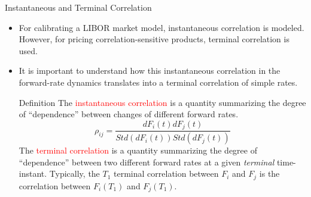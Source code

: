 \documentclass{beamer}
\begin{document}
\begin{frame}{Instantaneous and Terminal Correlation}
\begin{itemize}
\item For calibrating a LIBOR market model, instantaneous
correlation is modeled. However, for pricing correlation-sensitive products, terminal correlation is used.
\item It is important to understand how this instantaneous correlation in the forward-rate dynamics translates into a terminal correlation of simple rates.
	
\begin{block}{Definition}
The \textcolor{red}{instantaneous correlation} is a quantity summarizing the degree of “dependence” between changes of different forward rates.
\begin{equation*}
\rho_{ij} = \frac{dF_i(t) dF_j(t)}{Std(dF_i(t)) Std(dF_j(t))}
\end{equation*}
The \textcolor{red}{terminal correlation} is a quantity summarizing the degree of “dependence” between two different forward rates at a given \emph{terminal} time-instant. Typically, the $T_1$ terminal correlation between $F_i$ and $F_j$ is the correlation between $F_i(T_1)$ and $F_j(T_1)$.
\end{block}
	
\end{itemize}
\end{frame}
\end{document}
